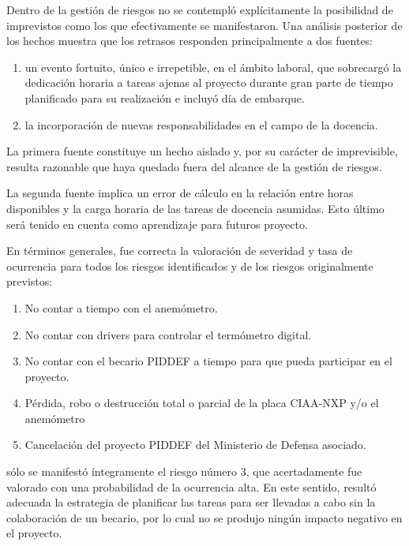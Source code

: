 
Dentro de la gestión de riesgos no se contempló explícitamente la posibilidad de imprevistos como los que efectivamente se manifestaron.  Una análisis posterior de los hechos muestra que los retrasos responden principalmente a dos fuentes:

\begin{enumerate}
	\item un evento fortuito, único e irrepetible, en el ámbito laboral, que sobrecargó la dedicación horaria a tareas ajenas al proyecto durante gran parte de tiempo planificado para su realización e incluyó día de embarque.
	\item la incorporación de nuevas responsabilidades en el campo de la docencia.
\end{enumerate}

La primera fuente constituye un hecho aislado y, por su carácter de imprevisible, resulta razonable que haya quedado fuera del alcance de la gestión de riesgos.  

La segunda fuente implica un error de cálculo en la relación entre horas disponibles y la carga horaria de las tareas de docencia asumidas.  Esto último será tenido en cuenta como aprendizaje para futuros proyecto.

En términos generales, fue correcta la valoración de severidad y tasa de ocurrencia para todos los riesgos identificados y de los riesgos originalmente previstos:

\begin{enumerate}
	\item No contar a tiempo con el anemómetro.
	\item No contar con drivers para controlar el termómetro digital.
	\item No contar con el becario PIDDEF a tiempo para que pueda participar en el proyecto.
	\item Pérdida, robo o destrucción total o parcial de la placa CIAA-NXP y/o el anemómetro
	\item Cancelación del proyecto PIDDEF del Ministerio de Defensa asociado.
\end{enumerate}

\noindent sólo se manifestó íntegramente el riesgo número 3, que acertadamente fue valorado con una probabilidad de la ocurrencia alta. En este sentido, resultó adecuada la estrategia de planificar las tareas para ser llevadas a cabo sin la colaboración de un becario, por lo cual no se produjo ningún impacto negativo en el proyecto. 

